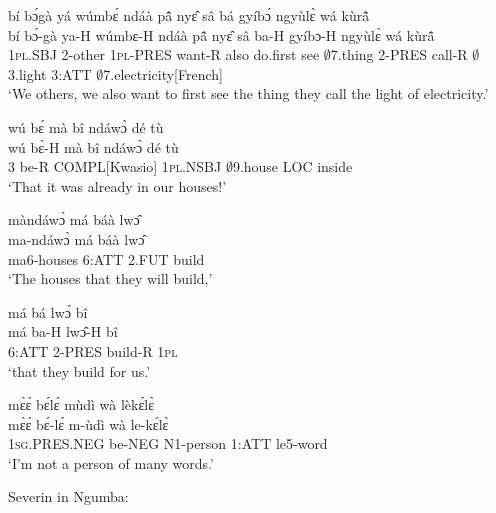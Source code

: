 \begin{exe} 
\exC\label{158} 
  \glll  bí bɔ́gà yá wúmbɛ́ ndáà pã̂ nyɛ̂ sâ bá gyíbɔ́ ngyùlɛ̀ wá kùrã̂ \\
         bí bɔ́-gà ya-H wúmbɛ-H ndáà pã̂ nyɛ̂ sâ ba-H gyíbɔ-H ngyùlɛ̀ wá kùrã̂ \\
          1\textsc{pl}.SBJ 2-other 1\textsc{pl}-PRES want-R also do.first see $\emptyset$7.thing 2-PRES call-R $\emptyset$3.light 3:ATT $\emptyset$7.electricity[French]  \\
    \trans `We others, we also want to first see the thing they call the light of electricity.'
\end{exe}

\begin{exe} 
\exC\label{159}
  \glll  wú bɛ́ mà bî ndáwɔ̀ dé tù \\
         wú bɛ̀-H mà bî ndáwɔ̀ dé tù \\
         3 be-R COMPL[Kwasio] 1\textsc{pl}.NSBJ $\emptyset$9.house LOC inside   \\
    \trans `That it was already in our houses!'
\end{exe}

\begin{exe} 
\exC\label{160} 
  \glll   màndáwɔ̀ má báà lwɔ̂ \\
          ma-ndáwɔ̀ má báà lwɔ̂ \\
          ma6-houses 6:ATT 2.FUT build  \\
    \trans `The houses that they will build,'
\end{exe}

\begin{exe} 
\exC\label{161} 
  \glll má bá lwɔ́ bî \\
         má ba-H lwɔ̂-H bî \\
          6:ATT 2-PRES build-R 1\textsc{pl}  \\
    \trans `that they build for us.'
\end{exe}

\begin{exe} 
\exC\label{162}
  \glll  mɛ̀ɛ́ bɛ́lɛ́ mùdì wà lèkɛ́lɛ̀ \\
         mɛ̀ɛ́ bɛ́-lɛ́ m-ùdì wà le-kɛ́lɛ̀ \\
          1\textsc{sg}.PRES.NEG be-NEG N1-person 1:ATT le5-word  \\
    \trans `I'm not a person of many words.'
\end{exe}

\noindent Severin in Ngumba:

